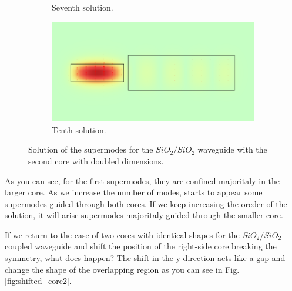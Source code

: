\documentclass[a4paper,12pt]{article}
\begin{document}
\begin{figure}[H]
\begin{subfigure}{0.45\textwidth}
        \caption{Seventh solution.}
    \end{subfigure}
    \hfill
    \begin{subfigure}{0.45\textwidth}
        \centering
        \includegraphics[scale=0.32]{SiO2_SiO2_d0.5um_w12um_t4um_normE_9.png}
        \caption{Tenth solution.}
    \end{subfigure}
    \caption{Solution of the supermodes for the $SiO_2/SiO_2$ waveguide with the second core with doubled dimensions.}
    \label{fig:double_size}
\end{figure}

As you can see, for the first supermodes, they are confined majoritaly in the larger core. As we increase the number of modes, starts to appear some supermodes guided through both cores. If we keep increasing the oreder of the solution, it will arise supermodes majoritaly guided through the smaller core. 

If we return to the case of two cores with identical shapes for the $SiO_2/SiO_2$ coupled waveguide and shift the position of the right-side core breaking the symmetry, what does happen? The shift in the y-direction acts like a gap and change the shape of the overlapping region as you can see in Fig. \ref{fig:shifted_core2}.
\end{document}
